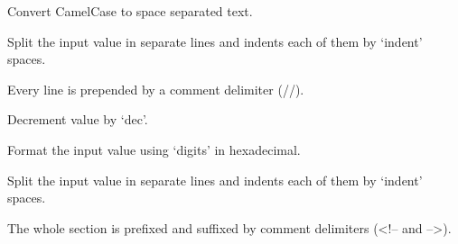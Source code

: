 \documentclass[letterpaper,10pt,english]{sphinxmanual}
\begin{document}

\begin{fulllineitems}
\label{\detokenize{developer:wuppercodegen.filter.camel_case_to_space}}
Convert CamelCase to space separated text.

\end{fulllineitems}


\begin{fulllineitems}
\label{\detokenize{developer:wuppercodegen.filter.cpp_comment}}
Split the input value in separate lines and indents each of them by `indent' spaces.

Every line is prepended by a comment delimiter (//).

\end{fulllineitems}


\begin{fulllineitems}
\label{\detokenize{developer:wuppercodegen.filter.dec}}
Decrement value by `dec'.

\end{fulllineitems}


\begin{fulllineitems}
\label{\detokenize{developer:wuppercodegen.filter.hex}}
Format the input value using `digits' in hexadecimal.

\end{fulllineitems}


\begin{fulllineitems}
\label{\detokenize{developer:wuppercodegen.filter.html_comment}}
Split the input value in separate lines and indents each of them by `indent' spaces.

The whole section is prefixed and suffixed by comment delimiters (\textless{}!-- and --\textgreater{}).

\end{fulllineitems}
\end{document}
